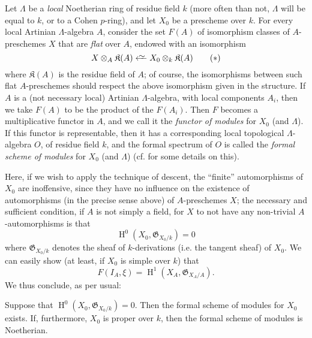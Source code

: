 \documentclass{article}
\theoremstyle{plain}
\newenvironment{proposition}[1]
  {\renewcommand\theinnercustomproposition{#1}\innercustomproposition}
  {\endinnercustomproposition}
\theoremstyle{definition}
\newcommand{\fk}[1]{{\mathfrak{#1}}}
\newcommand{\kres}{\mathfrak{K}}
\newcommand{\simfrom}{\xleftarrow{\raisebox{-0.7ex}[0ex][0ex]{$\sim$}}}
\DeclareMathOperator{\HH}{H}
\newcommand{\oldpage}[1]{\marginpar{\footnotesize$\Big\vert$ \textit{p.~#1}}}
\begin{document}
Let $\Lambda$ be a \emph{local} Noetherian ring of residue field $k$ (more often than not, $\Lambda$ will be equal to $k$, or to a Cohen $p$-ring), and let $X_0$ be a prescheme over $k$.
For every local Artinian $\Lambda$-algebra $A$, consider the set $F(A)$ of isomorphism classes of $A$-preschemes $X$ that are \emph{flat} over $A$, endowed with an isomorphism
\[
\label{*}
  X\otimes_A\kres(A) \simfrom X_0\otimes_k\kres(A)
\tag{$*$}
\]
where $\kres(A)$ is the residue field of $A$;
of course, the isomorphisms between such flat $A$-preschemes should respect the above isomorphism given in the structure.
If $A$ is a (not necessary local) Artinian $\Lambda$-algebra, with local components $A_i$, then we take $F(A)$ to be the product of the $F(A_i)$.
Then $F$ becomes a multiplicative functor in $A$, and we call it the \emph{functor of modules} for $X_0$ (and $\Lambda$).
If this functor is representable, then it has a corresponding local topological $\Lambda$-algebra $O$, of residue field $k$, and the formal spectrum of $O$ is called the \emph{formal scheme of modules} for $X_0$ (and $\Lambda$) (cf. \cite{2} for some details on this).

Here, if we wish to apply the technique of descent, the ``finite'' automorphisms of $X_0$ are inoffensive, since they have no influence on the existence of automorphisms (in the precise sense above) of $A$-preschemes $X$;
the necessary and sufficient condition, if $A$ is not simply a field, for $X$ to not have any non-trivial $A$-automorphisms is that
\[
  \HH^0(X_0,\fk{G}_{X_0/k}) = 0
\]
where $\fk{G}_{X_0/k}$ denotes the sheaf of $k$-derivations (i.e. the tangent sheaf) of $X_0$.
We can easily show (at least, if $X_0$ is simple over $k$) that
\[
  F(I_A,\xi) = \HH^1(X_A,\fk{G}_{X_A/A}).
\]
We thus conclude, as per usual:

\oldpage{195-18}
\begin{proposition}{4.1}
\label{C.4-proposition1}
  Suppose that $\HH^0(X_0,\fk{G}_{X_0/k})=0$.
  Then the formal scheme of modules for $X_0$ exists.
  If, furthermore, $X_0$ is proper over $k$, then the formal scheme of modules is Noetherian.
\end{proposition}
\end{document}
